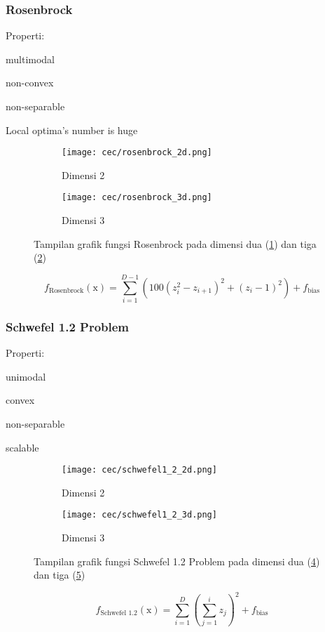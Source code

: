 \subsubsection{Rosenbrock}
\noindent Properti:
\begin{packed_item}
  \item multimodal
  \item non-convex
  \item non-separable
  \item Local optima's number is huge
\end{packed_item}
\begin{figure}[H]
	\centering
	\begin{subfigure}[b]{0.4\textwidth}
		\centering
		\texttt{[image: cec/rosenbrock\_2d.png]}
		\caption{Dimensi 2}
		\label{fig:rosenbrock-2d}
	\end{subfigure}
	\hfill
	\begin{subfigure}[b]{0.4\textwidth}
		\centering
		\texttt{[image: cec/rosenbrock\_3d.png]}
		\caption{Dimensi 3}
		\label{fig:rosenbrock-3d}
	\end{subfigure}
	\caption{Tampilan grafik fungsi Rosenbrock pada dimensi dua (\cref{fig:rosenbrock-2d}) dan tiga (\cref{fig:rosenbrock-3d})}
	\label{fig:rosenbrock}
\end{figure}
\begin{equation}
  f_{\text{Rosenbrock}}(\mathrm{x})=\sum_{i=1}^{D-1}\left(100\left(z_i^2-z_{i+1} \right)^2+\left( z_i-1\right)^2 \right) +f_{\text{bias}}
\end{equation}

\subsubsection{Schwefel 1.2 Problem}
\noindent Properti:
\begin{packed_item}
  \item unimodal
  \item convex
  \item non-separable
  \item scalable
\end{packed_item}
\begin{figure}[H]
	\centering
	\begin{subfigure}[b]{0.4\textwidth}
		\centering
		\texttt{[image: cec/schwefel1\_2\_2d.png]}
		\caption{Dimensi 2}
		\label{fig:schwefel1_2-2d}
	\end{subfigure}
	\hfill
	\begin{subfigure}[b]{0.4\textwidth}
		\centering
		\texttt{[image: cec/schwefel1\_2\_3d.png]}
		\caption{Dimensi 3}
		\label{fig:schwefel1_2-3d}
	\end{subfigure}
	\caption{Tampilan grafik fungsi Schwefel 1.2 Problem pada dimensi dua (\cref{fig:schwefel1_2-2d}) dan tiga (\cref{fig:schwefel1_2-3d})}
	\label{fig:schwefel1_2}
\end{figure}
\begin{equation}
  f_{\text{Schwefel 1.2}}(\mathrm{x})=\sum_{i=1}^{D}\left(\sum_{j=1}^{i}z_j \right)^2 +f_{\text{bias}}
\end{equation}

